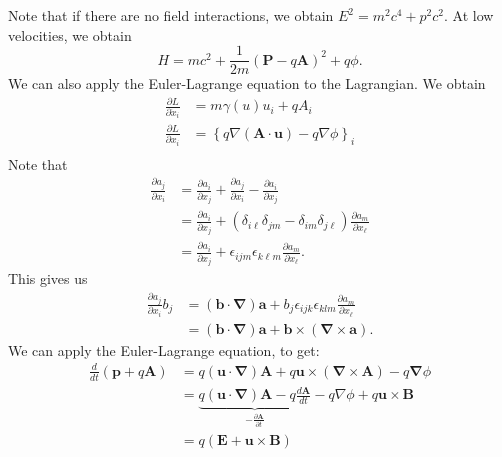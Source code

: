 \documentclass{article}
\numberwithin{equation}{section}
\begin{document}
Note that if there are no field interactions, we obtain $E^2 = m^2c^4 + p^2c^2.$ At low velocities, we obtain 
\begin{equation}
    H = mc^2 + \frac{1}{2m}(\bm{P}-q\bm{A})^2 + q\phi.
\end{equation}
We can also apply the Euler-Lagrange equation to the Lagrangian. We obtain 
\begin{align}
    \frac{\partial L}{\partial \dot{x}_i} &= m\gamma(u) u_i + qA_i \\ 
    \frac{\partial L}{\partial x_i} &= \left\{q \nabla (\bm{A} \cdot \bm{u}) - q\nabla\phi\right\}_i \\ 
\end{align}
Note that 
\begin{align}
    \frac{\partial a_j}{\partial x_i} &= \frac{\partial a_i}{\partial x_j} + \frac{\partial a_j}{\partial x_i} - \frac{\partial a_i}{\partial x_j} \\ 
    &= \frac{\partial a_i}{\partial x_j} + \left(\delta_{i\ell}\delta_{jm} - \delta_{im}\delta_{j\ell}\right)\frac{\partial a_m}{\partial x_\ell} \\ 
    &= \frac{\partial a_i}{\partial x_j} + \epsilon_{ijm}\epsilon_{k\ell m}\frac{\partial a_m}{\partial x_\ell}.
\end{align}
This gives us 
\begin{align}
    \frac{\partial a_j}{\partial x_i} b_j &= \left(\bm{b}\cdot \bm{\nabla}\right) \bm{a} + b_j \epsilon_{ijk}\epsilon_{klm}\frac{\partial a_m}{\partial x_\ell} \\ 
    &= (\bm{b}\cdot \bm{\nabla})\bm{a} + \bm{b} \times \left(\bm{\nabla}\times \bm{a}\right).
\end{align}
We can apply the Euler-Lagrange equation, to get:
\begin{align}
    \frac{d}{dt}\left(\bm{p} + q\bm{A}\right) &= q(\bm{u}\cdot \bm{\nabla}) \bm{A} + q\bm{u} \times (\bm{\nabla}\times \bm{A})  - q\bm{\nabla}\phi\\
    &= \underbrace{q(\bm{u}\cdot \bm{\nabla})\bm{A} - q\frac{d\bm{A}}{dt}}_{-\frac{\partial \bm{A}}{\partial t}} - q\nabla\phi + q\bm{u}\times \bm{B} \\ 
    &= q(\bm{E} + \bm{u} \times \bm{B})
\end{align}
\end{document}
